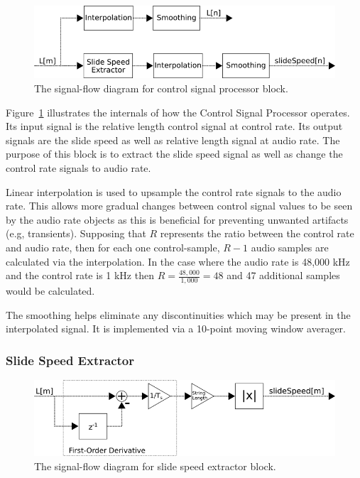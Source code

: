 \documentclass[../main.tex]{subfiles}
\begin{document}
\begin{figure}[h]
    \centering
    \includegraphics[scale=.65]{./images/diagrams/controlSignalProcessor.png}
    \caption{The signal-flow diagram for control signal processor block.}
    \label{fig:CSP}
\end{figure}

Figure~\ref{fig:CSP} illustrates the internals of how the Control Signal Processor operates. Its input signal is the relative length control signal at control rate. Its output signals are the slide speed as well as relative length signal at audio rate. The purpose of this block is to extract the slide speed signal as well as change the control rate signals to audio rate.

Linear interpolation is used to upsample the control rate signals to the audio rate. This allows more gradual changes between control signal values to be seen by the audio rate objects as this is beneficial for preventing unwanted artifacts (e.g, transients). Supposing that $R$ represents the ratio between the control rate and audio rate, then for each one control-sample, $R-1$ audio samples are calculated via the interpolation. In the case where the audio rate is 48,000 kHz and the control rate is 1 kHz then $R = \frac{48,000}{1,000} = 48$ and 47 additional samples would be calculated.

The smoothing helps eliminate any discontinuities which may be present in the interpolated signal. It is implemented via a 10-point moving window averager.

\subsubsection{Slide Speed Extractor}

\begin{figure}[h]
    \centering
    \includegraphics[scale=.5]{./images/diagrams/slideSpeedExtractor.png}
    \caption{The signal-flow diagram for slide speed extractor block.}
    \label{fig:SSE}
\end{figure}
\end{document}
